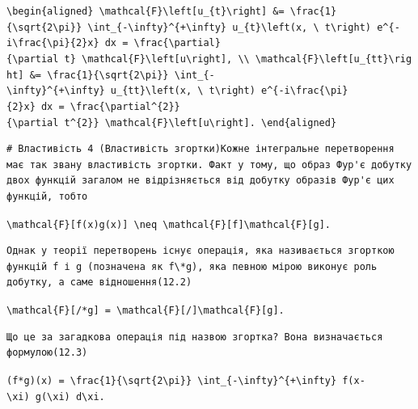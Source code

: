 \documentclass[
  ukrainian,
]{article}
\begin{document}
\texttt{\textbackslash{}begin\{aligned\}\ \textbackslash{}mathcal\{F\}\textbackslash{}left{[}u\_\{t\}\textbackslash{}right{]}\ \&=\ \textbackslash{}frac\{1\}\{\textbackslash{}sqrt\{2\textbackslash{}pi\}\}\ \textbackslash{}int\_\{-\textbackslash{}infty\}\^{}\{+\textbackslash{}infty\}\ u\_\{t\}\textbackslash{}left(x,\ \textbackslash{}\ t\textbackslash{}right)\ e\^{}\{-i\textbackslash{}frac\{\textbackslash{}pi\}\{2\}x\}\ dx\ =\ \textbackslash{}frac\{\textbackslash{}partial\}\{\textbackslash{}partial\ t\}\ \textbackslash{}mathcal\{F\}\textbackslash{}left{[}u\textbackslash{}right{]},\ \textbackslash{}\textbackslash{}\ \textbackslash{}mathcal\{F\}\textbackslash{}left{[}u\_\{tt\}\textbackslash{}right{]}\ \&=\ \textbackslash{}frac\{1\}\{\textbackslash{}sqrt\{2\textbackslash{}pi\}\}\ \textbackslash{}int\_\{-\textbackslash{}infty\}\^{}\{+\textbackslash{}infty\}\ u\_\{tt\}\textbackslash{}left(x,\ \textbackslash{}\ t\textbackslash{}right)\ e\^{}\{-i\textbackslash{}frac\{\textbackslash{}pi\}\{2\}x\}\ dx\ =\ \textbackslash{}frac\{\textbackslash{}partial\^{}\{2\}\}\{\textbackslash{}partial\ t\^{}\{2\}\}\ \textbackslash{}mathcal\{F\}\textbackslash{}left{[}u\textbackslash{}right{]}.\ \textbackslash{}end\{aligned\}}

\begin{verbatim}
# Властивість 4 (Властивість згортки)Кожне інтегральне перетворення має так звану властивість згортки. Факт у тому, що образ Фур'є добутку двох функцій загалом не відрізняється від добутку образів Фур'є цих функцій, тобто
\end{verbatim}

\texttt{\textbackslash{}mathcal\{F\}{[}f(x)g(x){]}\ \textbackslash{}neq\ \textbackslash{}mathcal\{F\}{[}f{]}\textbackslash{}mathcal\{F\}{[}g{]}.}

\begin{verbatim}
Однак у теорії перетворень існує операція, яка називається згорткою функцій f і g (позначена як f\*g), яка певною мірою виконує роль добутку, а саме відношення(12.2)
\end{verbatim}

\texttt{\textbackslash{}mathcal\{F\}{[}/*g{]}\ =\ \textbackslash{}mathcal\{F\}{[}/{]}\textbackslash{}mathcal\{F\}{[}g{]}.}

\begin{verbatim}
Що це за загадкова операція під назвою згортка? Вона визначається формулою(12.3)
\end{verbatim}

\texttt{(f*g)(x)\ =\ \textbackslash{}frac\{1\}\{\textbackslash{}sqrt\{2\textbackslash{}pi\}\}\ \textbackslash{}int\_\{-\textbackslash{}infty\}\^{}\{+\textbackslash{}infty\}\ f(x-\textbackslash{}xi)\ g(\textbackslash{}xi)\ d\textbackslash{}xi.}
\end{document}
